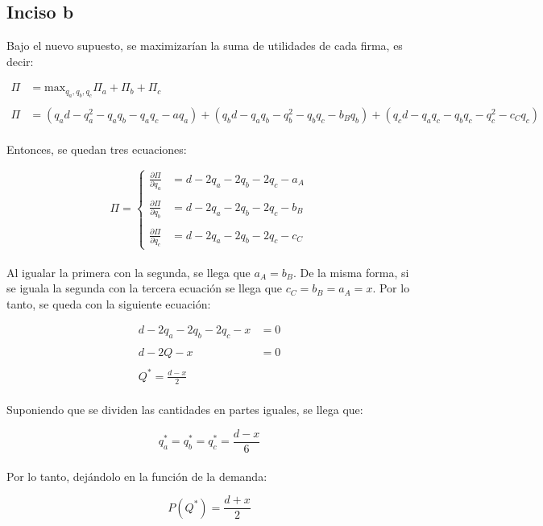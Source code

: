 \documentclass[
	spanish, %
	letterpaper, oneside
]{article}
\begin{document}
\subsection{Inciso b}

Bajo el nuevo supuesto, se maximizarían la suma de utilidades de cada firma, es decir:

\begin{align*}
	\Pi &= \text{max}_{q_a,q_b,q_c} \Pi_a + \Pi_b + \Pi_c \\\\
	\Pi &= (q_a d - q_{a}^{2} - q_a q_b - q_a q_c - aq_a) + (q_b d - q_a q_b - q_{b}^{2} - q_b q_c - b_B q_b) + (q_c d - q_a q_c - q_b q_c - q_{c}^{2}-c_C q_c)
\end{align*}\\

Entonces, se quedan tres ecuaciones:

$$\Pi=\begin{cases}
		  \frac{\partial\Pi}{\partial q_a} &= d-2q_a - 2q_b - 2q_c - a_A\\\\
		  \frac{\partial\Pi}{\partial q_b} &= d-2q_a - 2q_b - 2q_c - b_B\\\\
		  \frac{\partial\Pi}{\partial q_c} &= d-2q_a - 2q_b - 2q_c - c_C
	  \end{cases}$$\\

Al igualar la primera con la segunda, se llega que $a_A = b_B$. De la misma forma, si se iguala la segunda con la tercera ecuación
se llega que $c_C = b_B = a_A = x$. Por lo tanto, se queda con la siguiente ecuación:

\begin{align*}
	d-2q_a-2q_b-2q_c-x &= 0\\\\
	d - 2Q - x &= 0\\\\
	Q^* = \frac{d-x}{2}
\end{align*}\\

Suponiendo que se dividen las cantidades en partes iguales, se llega que:

$$q_{a}^{*} = q_{b}^{*} = q_{c}^{*}=\frac{d-x}{6}$$\\

Por lo tanto, dejándolo en la función de la demanda:

$$P(Q^*) = \frac{d+x}{2}$$\\
\end{document}
